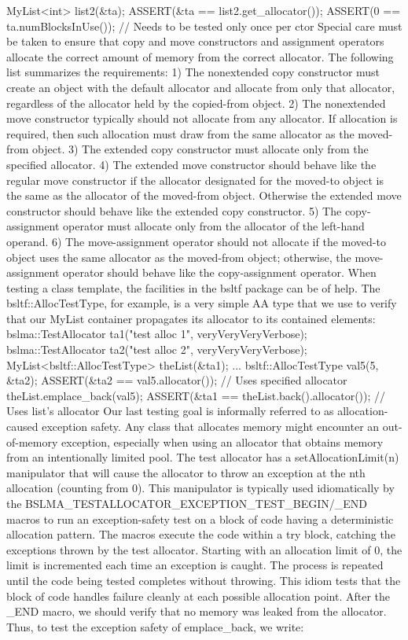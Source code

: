 {{{{{{{{MyList<int> list2(&ta);
ASSERT(&ta == list2.get_allocator());
ASSERT(0 == ta.numBlocksInUse()); // Needs to be tested only once per ctor
Special care must be taken to ensure that copy and move constructors and assignment operators allocate the correct amount of memory from the correct allocator. The following list summarizes the requirements:
1)	The nonextended copy constructor must create an object with the default allocator and allocate from only that allocator, regardless of the allocator held by the copied-from object.
2)	The nonextended move constructor typically should not allocate from any allocator. If allocation is required, then such allocation must draw from the same allocator as the moved-from object.
3)	The extended copy constructor must allocate only from the specified allocator.
4)	The extended move constructor should behave like the regular move constructor if the allocator designated for the moved-to object is the same as the allocator of the moved-from object. Otherwise the extended move constructor should behave like the extended copy constructor.
5)	The copy-assignment operator must allocate only from the allocator of the left-hand operand.
6)	The move-assignment operator should not allocate if the moved-to object uses the same allocator as the moved-from object; otherwise, the move-assignment operator should behave like the copy-assignment operator.
When testing a class template, the facilities in the bsltf package  can be of help. The bsltf::AllocTestType, for example, is a very simple AA type that we use to verify that our MyList container propagates its allocator to its contained elements:
bslma::TestAllocator ta1("test alloc 1", veryVeryVeryVerbose);
bslma::TestAllocator ta2("test alloc 2", veryVeryVeryVerbose);
MyList<bsltf::AllocTestType> theList(&ta1);
...
bsltf::AllocTestType val5(5, &ta2);
ASSERT(&ta2 == val5.allocator());  // Uses specified allocator
theList.emplace_back(val5);
ASSERT(&ta1 == theList.back().allocator());  // Uses list's allocator
Our last testing goal is informally referred to as allocation-caused exception safety. Any class that allocates memory might encounter an out-of-memory exception, especially when using an allocator that obtains memory from an intentionally limited pool. The test allocator has a setAllocationLimit(n) manipulator that will cause the allocator to throw an exception at the nth allocation (counting from 0). This manipulator is typically used idiomatically by the BSLMA_TESTALLOCATOR_EXCEPTION_TEST_BEGIN/_END macros to run an exception-safety test on a block of code having a deterministic allocation pattern. The macros execute the code within a try block, catching the exceptions thrown by the test allocator. Starting with an allocation limit of 0, the limit is incremented each time an exception is caught. The process is repeated until the code being tested completes without throwing. This idiom tests that the block of code handles failure cleanly at each possible allocation point. After the _END macro, we should verify that no memory was leaked from the allocator. Thus, to test the exception safety of emplace_back, we write:
}}}}}}}}
